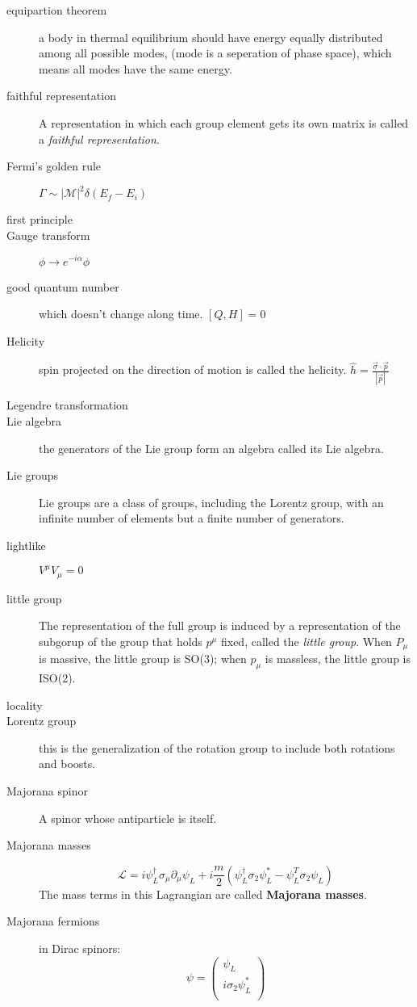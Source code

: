 \begin{description}
    \item [equipartion theorem] a body in thermal equilibrium should have
	energy equally distributed among all possible modes, (mode is a
	seperation of phase space), which means all modes have the same
	energy.

    \item [faithful representation] A representation in which each group
	element gets its own matrix is called a \emph{faithful
	representation}.
    \item [Fermi's golden rule]	$\Gamma \sim |\mathcal{M}|^{2}\delta(E_f - E_i)$
    \item [first principle]

    \item [Gauge transform] $\phi \rightarrow e^{-i\alpha}\phi$
    \item [good quantum number] which doesn't change along time. $[Q, H] = 0$

    \item [Helicity] spin projected on the direction of motion is called the
	helicity. $\hat{h}=\frac{\vec{\sigma}\cdot\vec{p}}{|\vec{p}|}$

    \item [Legendre transformation]
    \item [Lie algebra] the generators of the Lie group form an algebra
	called its Lie algebra. 
    \item [Lie groups]	Lie groups are a class of groups, including the
	Lorentz group, with an infinite number of elements but a finite
	number of generators.
    \item [lightlike]	$V^\mu V_\mu = 0$
    \item [little group] The representation of the full \Poincare{}
	group is induced by a representation of the subgorup of the
	\Poincare{} group that holds $p^\mu$ fixed, called the
	\emph{little group}. When $P_\mu$ is massive, the little group is
	SO(3); when $p_\mu$ is massless, the little group is ISO(2).
    \item [locality]
    \item [Lorentz group] this is the generalization of the rotation group
	to include both rotations and boosts.

    \item [Majorana spinor] A spinor whose antiparticle is itself. 
    \item [Majorana masses]
	\[
	    \mathcal{L}=i\psi^\dag_L\sigma_\mu\partial_\mu\psi_L+i\frac{m}{2}(\psi^\dag_L\sigma_2\psi^*_L-\psi^T_L\sigma_2\psi_L)
	\]
	The mass terms in this Lagrangian are called \textbf{Majorana masses}.
    \item [Majorana fermions]
	in Dirac spinors:
	\[
	    \psi=\begin{pmatrix}
		\psi_L	\\
		i\sigma_2\psi^*_L   \\
	    \end{pmatrix}
	\]


\end{description}
